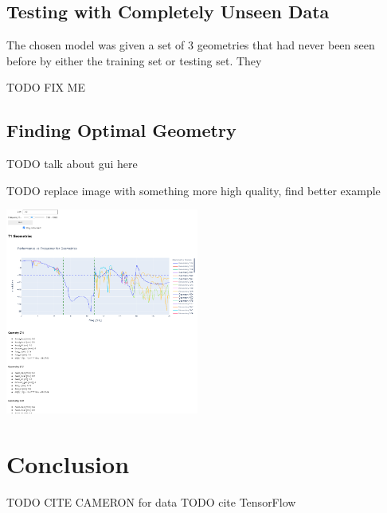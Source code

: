 \documentclass[lettersize,journal]{IEEEtran}
\newenvironment{Figure}
    {\par\medskip\noindent\minipage{\linewidth}}
    {\endminipage\par\medskip}
\begin{document}
\subsection{Testing with Completely Unseen Data}
The chosen model was given a set of 3 geometries that had never been seen before by either the training set or testing set. They 

TODO FIX ME 

\subsection{Finding Optimal Geometry}
TODO talk about gui here 

TODO replace image with something more high quality, find better example 

\begin{Figure}
    \centering
    \includegraphics[width=2.5in]{gui}
    \label{gui}
\end{Figure}


\section{Conclusion}

TODO CITE CAMERON for data
TODO cite TensorFlow





\vfill
\end{document}
